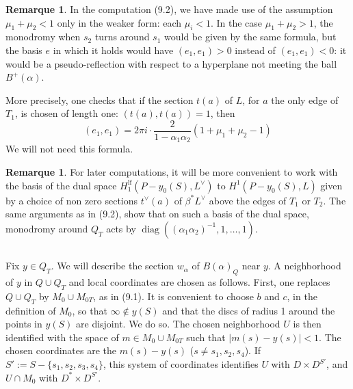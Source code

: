 \documentclass[12pt,a4paper]{article}
\theoremstyle{plain}
\theoremstyle{definition}
\newtheorem{remark}[theorem]{Remarque}
\theoremstyle{remark}
\DeclareMathOperator{\diag}{diag}
\numberwithin{equation}{section}
\begin{document}
\begin{remark}\label{rmk:9.3}
In the computation (9.2), we have made use of the assumption $\mu_1 + \mu_2 < 1$ only in the weaker form: each $\mu_i < 1$. In the case $\mu_1 + \mu_2 > 1$, the monodromy when $s_2$ turns around $s_1$ would be given by the same formula, but the basis $e$ in which it holds would have $(e_1, e_1) > 0$ instead of $(e_1, e_1) < 0$: it would be a pseudo-reflection with respect to a hyperplane not meeting the ball $B^+(\alpha)$.

More precisely, one checks that if the section $t(a)$ of $L$, for $a$ the only edge of $T_1$, is chosen of length one: $(t(a), t(a)) = 1$, then
\[
(e_1, e_1) = 2\pi i \cdot \frac{2}{1 - \alpha_1 \alpha_2} (1 + \mu_1 + \mu_2 - 1)
\]
We will not need this formula.
\end{remark}

\begin{remark}\label{rmk:9.4}
For later computations, it will be more convenient to work with the basis of the dual space $H^{\mathrm{lf}}_1(P - y_0(S), L^\vee)$ to $H^1(P - y_0(S), L)$ given by a choice of non zero sections $t^\vee(a)$ of $\beta^*L^\vee$ above the edges of $T_1$ or $T_2$. The same arguments as in (9.2), show that on such a basis of the dual space, monodromy around $Q_T$ acts by $\diag((\alpha_1 \alpha_2)^{-1}, 1, \ldots, 1)$.
\end{remark}

\subsection{}
Fix $y \in Q_T$. We will describe the section $w_\alpha$ of $B(\alpha)_Q$ near $y$. A neighborhood of $y$ in $Q \cup Q_T$ and local coordinates are chosen as follows. First, one replaces $Q \cup Q_T$ by $M_0 \cup M_{0T}$, as in (9.1). It is convenient to choose $b$ and $c$, in the definition of $M_0$, so that $\infty \notin y(S)$ and that the discs of radius 1 around the points in $y(S)$ are disjoint. We do so. The chosen neighborhood $U$ is then identified with the space of $m \in M_0 \cup M_{0T}$ such that $|m(s) - y(s)| < 1$. The chosen coordinates are the $m(s) - y(s)$ ($s \neq s_1, s_2, s_4$). If $S' := S - \{s_1, s_2, s_3, s_4\}$, this system of coordinates identifies $U$ with $D \times D^{S'}$, and $U \cap M_0$ with $D^* \times D^{S'}$.
\end{document}
